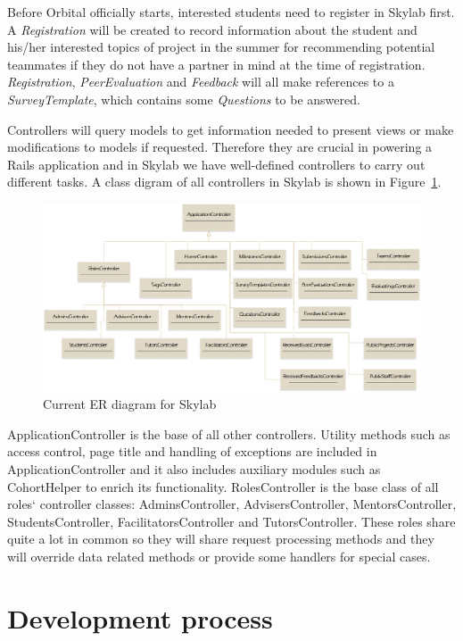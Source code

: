 Before Orbital officially starts, interested students need to register in Skylab first. A \textit{Registration} will be created to record information about the student and his/her interested topics of project in the summer for recommending potential teammates if they do not have a partner in mind at the time of registration. \textit{Registration}, \textit{PeerEvaluation} and \textit{Feedback} will all make references to a \textit{SurveyTemplate}, which contains some \textit{Questions} to be answered.

Controllers will query models to get information needed to present views or make modifications to models if requested. Therefore they are crucial in powering a Rails application and in Skylab we have well-defined controllers to carry out different tasks. A class digram of all controllers in Skylab is shown in Figure~\ref{fig:SkylabControllers}.

\begin{figure}[h]
  \centering
  \includegraphics[width=\textwidth]{Images/Skylab_Controllers.png}
  \caption{Current ER diagram for Skylab}
  \label{fig:SkylabControllers}
\end{figure}

ApplicationController is the base of all other controllers. Utility methods such as access control, page title and handling of exceptions are included in ApplicationController and it also includes auxiliary modules such as CohortHelper to enrich its functionality. RolesController is the base class of all roles` controller classes: AdminsController, AdvisersController, MentorsController, StudentsController, FacilitatorsController and TutorsController. These roles share quite a lot in common so they will share request processing methods and they will override data related methods or provide some handlers for special cases. 

\section{Development process}

